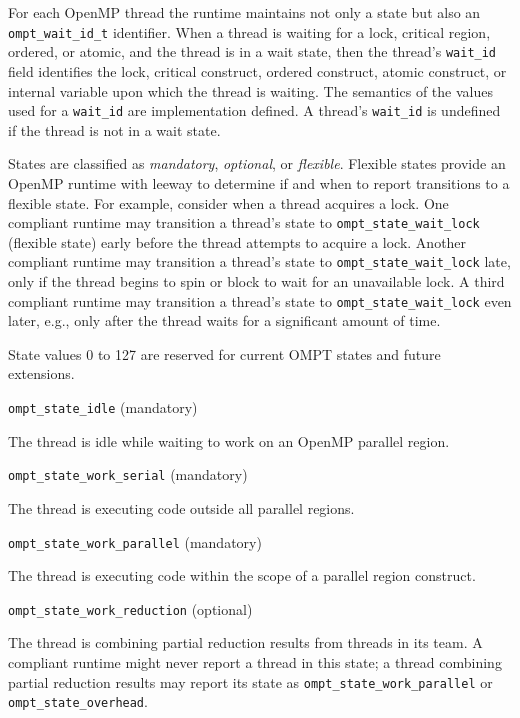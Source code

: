 \documentclass{article}
\newcommand{\descheader}[1]{{\needspace{3\baselineskip}\vspace{1em}\noindent \fbox{#1}}}
\begin{document}
For each OpenMP thread the runtime maintains not only a state but also an \verb|ompt_wait_id_t|
identifier.  When a thread is waiting for a lock, critical region,
ordered, or atomic, and the thread is in a wait
state, then 
the thread's \verb|wait_id| field identifies the lock, critical construct, ordered construct, atomic construct, or internal variable
upon which the
thread is waiting. The semantics of the values used for a \verb|wait_id| are implementation defined.
A thread's \verb|wait_id| is undefined if the thread
is not in a wait state.

States are classified as {\em mandatory}, {\em optional}, or {\em flexible}. 
Flexible states provide an OpenMP runtime with leeway to determine if
and when to report transitions to a flexible state.
For example, consider when a thread acquires a lock. One
compliant runtime may transition a thread's state to 
\verb|ompt_state_wait_lock| (flexible state) early before the thread attempts to acquire a
lock. Another compliant runtime may transition a thread's state to
\verb|ompt_state_wait_lock| late, only if the thread begins to spin or
block to wait for an unavailable lock. A third compliant runtime
may transition a thread's state to \verb|ompt_state_wait_lock| even later, e.g., only
after the thread waits for a significant amount of time. 

State values 0 to 127 are reserved for current OMPT states and future extensions.  

\descheader{Idle State}

\begin{description}
\item \verb|ompt_state_idle| (mandatory)

  The thread is idle while waiting to work on an OpenMP parallel
  region.
\end{description}

\descheader{Work States}

\begin{description}

\item \verb|ompt_state_work_serial| (mandatory)

  The thread is executing code outside all parallel regions. 

\item \verb|ompt_state_work_parallel| (mandatory)

  The thread is executing code within the scope of a parallel region construct.

\sloppy
\item \verb|ompt_state_work_reduction| (optional)
 
  The thread is combining partial reduction results from threads in its team. A compliant
  runtime might never report a thread in this state; a thread
  combining partial reduction results may  report its state as
  \verb|ompt_state_work_parallel| or \verb|ompt_state_overhead|.

\end{description}
\end{document}

